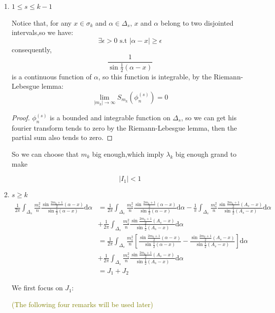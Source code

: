 \documentclass{article}
\begin{document}
\begin{enumerate}

\item $ 1 \leqslant s \leqslant k-1 $\par
        Notice that, for any $ x \in \sigma_k $ and $ \alpha \in \Delta_s $, $ x $ and $ \alpha $ belong to two disjointed intervals,so we have:
\[ \exists \epsilon >0 \text{ s.t } |\alpha-x|\geqslant \epsilon \]
    consequently, \[ \frac{1}{\sin\frac{1}{2}(\alpha-x)} \] is a continuous function of $ \alpha  $, so this function is integrable, by the Riemann-Lebesgue lemma:
\[\lim_{|m_k|\rightarrow \infty}S_{m_k}(\phi_n^{(s)}) = 0 \] 
        \begin{proof}
   $  \phi_n^{(s)}$ is a bounded and integrable function on $ \Delta_s $, so we can get his fourier transform tends to zero by the Riemann-Lebesgue lemma, then the partial sum also tends to zero.
        \end{proof}

So we can choose that $ m_k $ big enough,which imply $ \lambda_k $ big enough grand to make 

        \[ |I_1|<1 \]


\item $ s \geqslant k $
\begin{align*}
    \frac{1}{2\pi}\int_{\Delta_s}\frac{m_s^2}{n}\frac{\sin\frac{2m_k+1}{2}(\alpha-x)}{\sin\frac{1}{2}(\alpha-x)}\mathrm{d}\alpha 
    &=\frac{1}{2\pi}\int_{\Delta_s}\frac{m_s^2}{n}\frac{\sin\frac{2m_k+1}{2}(\alpha-x)}{\sin\frac{1}{2}(\alpha-x)}\mathrm{d}\alpha - \frac{1}{\pi}\int_{\Delta_s}\frac{m_s^2}{n}\frac{\sin\frac{2m_k+1}{2}(A_s-x)}{\sin\frac{1}{2}(A_s-x)}\mathrm{d}\alpha\\
    &+\frac{1}{2\pi}\int_{\Delta_s}\frac{m_s^2}{n}\frac{\sin\frac{2m_k+1}{2}(A_s-x)}{\sin\frac{1}{2}(A_s-x)}\mathrm{d}\alpha\\ 
    &= \frac{1}{2\pi}\int_{\Delta_s}\frac{m_s^2}{n}\left[\frac{\sin\frac{2m_k+1}{2}(\alpha-x)}{\sin\frac{1}{2}(\alpha-x)}   - \frac{\sin\frac{2m_k+1}{2}(A_s-x)}{\sin\frac{1}{2}(A_s-x)} \right]\mathrm{d}\alpha \\
    &+\frac{1}{2\pi}\int_{\Delta_s}\frac{m_s^2}{n}\frac{\sin\frac{2m_k+1}{2}(A_s-x)}{\sin\frac{1}{2}(A_s-x)}\mathrm{d}\alpha\\
    &=J_1+J_2
\end{align*}


We first focus on $ J_1 $:\par
\textcolor{olive}{(The following four remarks will be used later)}
\par


\end{enumerate}
\end{document}
